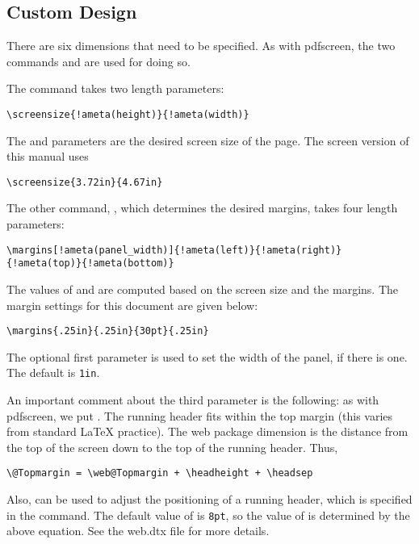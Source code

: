 \documentclass{article}
\let\pkg\textsf
\edef\amtIndent{\the\parindent}
\begin{document}
{\subsection{Custom Design}\label{cusDesign}

There are six dimensions that need to be specified. As with
\textsf{pdfscreen},  the two commands  and
 are used for doing so.

The command  takes two length parameters:
\begin{Verbatim}[xleftmargin=\amtIndent,commandchars=!()]
\screensize{!ameta(height)}{!ameta(width)}
\end{Verbatim}
\noindent The  and  parameters are the desired
screen size of the page. The screen version of this manual uses
\begin{Verbatim}[xleftmargin=\amtIndent]
\screensize{3.72in}{4.67in}
\end{Verbatim}
\noindent The other command, , which determines the desired
margins, takes four length parameters:
\begin{Verbatim}[xleftmargin=\amtIndent,commandchars=!()]
\margins[!ameta(panel_width)]{!ameta(left)}{!ameta(right)}{!ameta(top)}{!ameta(bottom)}
\end{Verbatim}
\newtopic The values of  and  are computed
based on the screen size and the margins. The margin settings for
this document are given below:
\begin{Verbatim}[xleftmargin=\amtIndent]
\margins{.25in}{.25in}{30pt}{.25in}
\end{Verbatim}
\newtopic The optional first parameter  is used to set
the width of the panel, if there is one.  The default is \texttt{1in}.

\begin{redpoint}\space\ignorespaces
An important comment about the third parameter
 is the following: as with \textsf{pdfscreen}, we put
.  The running header fits within the top
margin (this varies from standard \LaTeX{} practice).  The
\pkg{web} package dimension  is the distance
from the top of the screen down to the top of the running header. Thus,
\begin{Verbatim}[xleftmargin=\amtIndent]
\@Topmargin = \web@Topmargin + \headheight + \headsep
\end{Verbatim}
\noindent Also,  can be used to adjust the
positioning of a running header, which is specified in the
 command. The default value of  is
\texttt{8pt}, so the value of  is determined by the
above equation. See the \textsf{web.dtx} file for more details.
\end{redpoint}

}
\end{document}
